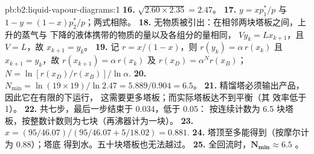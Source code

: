 \begin{solution}{pb:b2:liquid-vapour-diagrams:1}
\textbf{16.} $\sqrt{2.60 \times 2.35} = 2.47$。
\textbf{17.} $y = xp_1^*/p$ 与 $1 - y = (1 - x)p_2^*/p$；两式相除。
\textbf{18.} 无物质被引出：在相邻两块塔板之间，上升的蒸气与
下降的液体携带的物质的量以及各组分的量相同，
$V y_k = L x_{k+1}$，且 $V = L$，故 $x_{k+1} = y_k$。
\textbf{19.} 记 $r = x/(1 - x)$，则 $r(y_k) = \alpha\,r(x_k)$ 且 $x_{k+1} = y_k$，故
$r(x_{k+1}) = \alpha\,r(x_k)$ 及 $r(x_D) = \alpha^N r(x_B)$；$N = \ln[r(x_D)/
r(x_B)]/\ln\alpha$.
\textbf{20.} $N_{\min} = \ln(19 \times 19)/\ln 2.47 = 5.889/0.904 = 6.5$。
\textbf{21.} 精馏塔必须输出产品，因此它在有限的下运行，
这需要更多塔板；而实际塔板达不到平衡（其
效率低于 1）。
\textbf{22.} 共七步，最后一步结束于 0.034，低于 0.05：
按连续计数为 6.5 块塔板，按整数计数则为七块（再沸器计为一块）。
\textbf{23.} $x = (95/46.07)/(95/46.07 + 5/18.02) = 0.881$.
\textbf{24.} 塔顶至多能得到（按摩尔计为 0.88）；塔底
得到水。五十块塔板也无法越过。
\textbf{25.} 全回流时，$\boldsymbol{N_{\min} \approx 6.5}$ 。
\end{solution}
